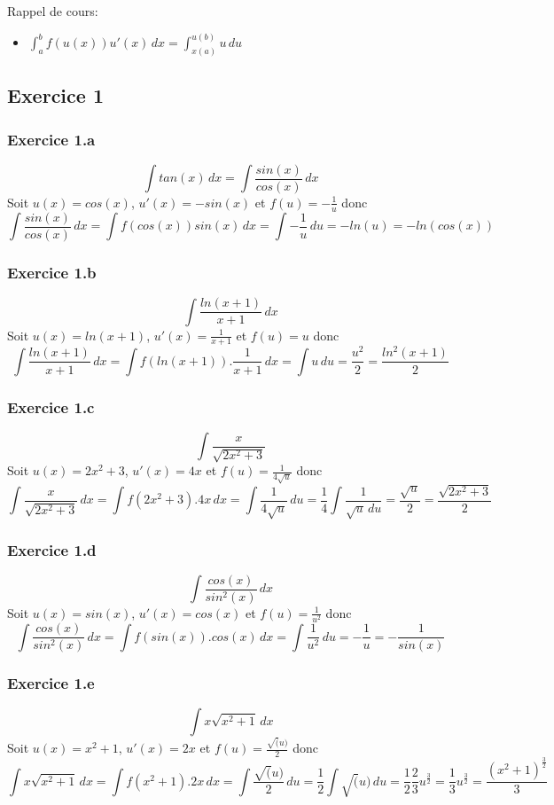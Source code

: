 \documentclass[]{book}
\theoremstyle{definition}
\begin{document}
Rappel de cours: 
\begin{itemize}
\item $\int_{a}^{b}{f(u(x))u'(x)\,dx} = \int_{x(a)}^{u(b)}{u\,du}$
\end{itemize}

 

\subsection*{Exercice 1}
\subsubsection*{Exercice 1.a}

$$\int tan(x)\,dx = \int \frac{sin(x)}{cos(x)}\,dx$$
Soit $u(x) = cos(x)$, $u'(x)=-sin(x)$ et $f(u) = -\frac{1}{u}$ donc
$$\int{\frac{sin(x)}{cos(x)}\,dx} = \int{f(cos(x))sin(x)\,dx} = \int{ -\frac{1}{u}\,du} = -ln(u) = -ln(cos(x))$$

\subsubsection*{Exercice 1.b}
$$\int{\frac{ln(x+1)}{x+1}}\,dx$$
Soit $u(x) = ln(x+1)$, $u'(x)=\frac{1}{x+1}$ et $f(u) = u$ donc
$$\int{\frac{ln(x+1)}{x+1}\,dx} = \int{f(ln(x+1)).\frac{1}{x+1}\,dx} = \int u\,du = \frac{u^2}{2} = \frac{ln^2(x+1)}{2}$$

\subsubsection*{Exercice 1.c}
$$\int{\frac{x}{\sqrt{2x^2+3}}}$$
Soit $u(x)=2x^2+3$, $u'(x)=4x$ et $f(u)=\frac{1}{4\sqrt{u}}$ donc
$$\int{\frac{x}{\sqrt{2x^2+3}}\,dx} = \int{f(2x^2+3).4x\,dx} = \int{\frac{1}{4\sqrt{u}}\,du} = \frac{1}{4}\int\frac{1}{\sqrt{u}\,du} = \frac{\sqrt{u}}{2} = \frac{\sqrt{2x^2+3}}{2}$$

\subsubsection*{Exercice 1.d}
$$\int{\frac{cos(x)}{sin^2(x)}}\,dx$$
Soit $u(x)=sin(x)$, $u'(x)=cos(x)$ et $f(u)=\frac{1}{u^2}$ donc
$$\int{\frac{cos(x)}{sin^2(x)}\,dx} = \int{f(sin(x)).cos(x)\,dx} = \int{\frac{1}{u^2}\,du} = -\frac{1}{u} = -\frac{1}{sin(x)}$$

\subsubsection*{Exercice 1.e}
$$\int {x\sqrt{x^2+1}\,dx}$$
Soit $u(x) = x^2+1$, $u'(x)=2x$ et $f(u)=\frac{\sqrt(u)}{2}$ donc
$$\int{x\sqrt{x^2+1}\,dx} = \int{f(x^2+1).2x\,dx} = \int{\frac{\sqrt(u)}{2}\,du} = \frac{1}{2}\int{\sqrt(u)\,du} = \frac{1}{2}\frac{2}{3}u^{\frac{3}{2}} = \frac{1}{3}u^{\frac{3}{2}} = \frac{(x^2+1)^{\frac{3}{2}}}{3}$$
\end{document}
